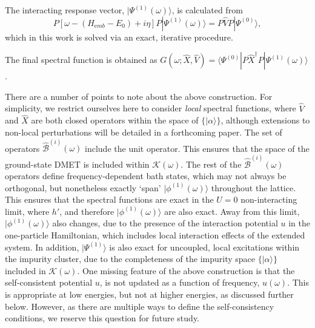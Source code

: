 \documentclass[aps,twocolumn,nobibnotes]{revtex4}
\begin{document}
\begin{inparaenum}
\item The interacting response vector, $|\Psi^{(1)} (\omega) \rangle$, is calculated from
\begin{equation}
    P \left[ \omega - (H_{\mathrm emb}-E_0) + i \eta \right] P | \Psi^{(1)}(\omega) \rangle = P {\hat V} P |\Psi^{(0)} \rangle   ,   \label{eqn:ExactResponse}
\end{equation}
which in this work is solved via an exact, iterative procedure\cite{Langou2005}.
\item The final spectral function is obtained as $G(\omega; \hat{X}, \hat{V}) = \langle \Psi^{(0)} | P \hat{X}^{\dagger} P | \Psi^{(1)}(\omega) \rangle$.
\end{inparaenum}

There are a number of points to note about the above construction. For simplicity, we restrict ourselves here to consider {\em local} spectral functions, where
${\hat V}$ and ${\hat X}$ are both closed operators within the space of $\{|\alpha \rangle \}$, although extensions to non-local perturbations will be detailed in a forthcoming paper.
The set of operators ${\hat {\mathcal{B}}}^{(i)}(\omega)$ include the unit operator.
This ensures that
the space of the ground-state DMET is included within $\mathcal{K}(\omega)$. The rest of the ${\hat {\mathcal{B}}}^{(i)}(\omega)$ operators define frequency-dependent
bath states, which may not always be orthogonal, but nonetheless exactly `span' $|\phi^{(1)}(\omega) \rangle$ throughout the lattice. This ensures that the spectral functions are exact in 
the $U=0$ non-interacting limit, where $h'$, and therefore $|\phi^{(1)}(\omega) \rangle$ are also exact. Away from this limit, 
$|\phi^{(1)}(\omega) \rangle$ also changes, due to the presence of the interaction potential $u$ in the one-particle Hamiltonian, which 
includes local interaction effects of the extended system.
In addition, $|\Psi^{(1)} \rangle $ is also exact for uncoupled, local excitations within the impurity cluster, due
to the completeness of the impurity space $\{ |\alpha \rangle \}$ included in $\mathcal{K}(\omega)$.
One missing feature of the above construction is that the self-consistent potential $u$, is not updated as a function
of frequency, $u(\omega)$. This is appropriate at low energies, but not at higher 
energies, as discussed further below. 
However, as there are multiple ways to define the self-consistency conditions, 
we reserve this question for future study.
\end{document}
